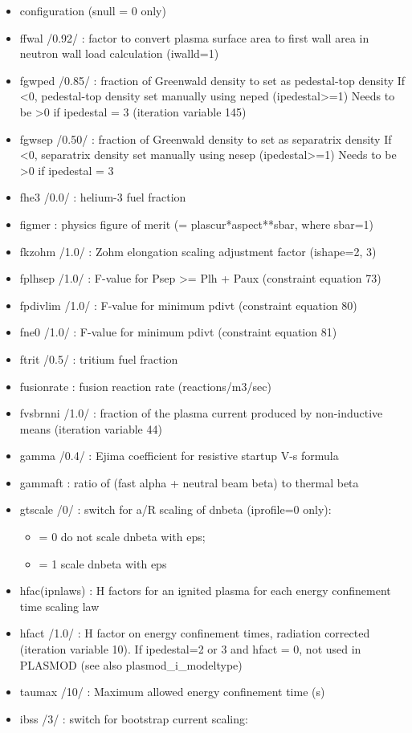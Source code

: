 \documentclass[]{article}
\providecommand{\tightlist}{%
  \setlength{\itemsep}{0pt}\setlength{\parskip}{0pt}}
\begin{document}
\begin{itemize}
\item
  configuration (snull = 0 only)
\item
  ffwal /0.92/ : factor to convert plasma surface area to first wall
  area in neutron wall load calculation (iwalld=1)
\item
  fgwped /0.85/ : fraction of Greenwald density to set as pedestal-top
  density If \textless{}0, pedestal-top density set manually using neped
  (ipedestal\textgreater{}=1) Needs to be \textgreater{}0 if ipedestal =
  3 (iteration variable 145)
\item
  fgwsep /0.50/ : fraction of Greenwald density to set as separatrix
  density If \textless{}0, separatrix density set manually using nesep
  (ipedestal\textgreater{}=1) Needs to be \textgreater{}0 if ipedestal =
  3
\item
  fhe3 /0.0/ : helium-3 fuel fraction
\item
  figmer : physics figure of merit (= plascur*aspect**sbar, where
  sbar=1)
\item
  fkzohm /1.0/ : Zohm elongation scaling adjustment factor (ishape=2, 3)
\item
  fplhsep /1.0/ : F-value for Psep \textgreater{}= Plh + Paux
  (constraint equation 73)
\item
  fpdivlim /1.0/ : F-value for minimum pdivt (constraint equation 80)
\item
  fne0 /1.0/ : F-value for minimum pdivt (constraint equation 81)
\item
  ftrit /0.5/ : tritium fuel fraction
\item
  fusionrate : fusion reaction rate (reactions/m3/sec)
\item
  fvsbrnni /1.0/ : fraction of the plasma current produced by
  non-inductive means (iteration variable 44)
\item
  gamma /0.4/ : Ejima coefficient for resistive startup V-s formula
\item
  gammaft : ratio of (fast alpha + neutral beam beta) to thermal beta
\item
  gtscale /0/ : switch for a/R scaling of dnbeta (iprofile=0 only):

  \begin{itemize}
  \tightlist
  \item
    = 0 do not scale dnbeta with eps;
  \item
    = 1 scale dnbeta with eps
  \end{itemize}
\item
  hfac(ipnlaws) : H factors for an ignited plasma for each energy
  confinement time scaling law
\item
  hfact /1.0/ : H factor on energy confinement times, radiation
  corrected (iteration variable 10). If ipedestal=2 or 3 and hfact = 0,
  not used in PLASMOD (see also plasmod\_i\_modeltype)
\item
  taumax /10/ : Maximum allowed energy confinement time (s)
\item
  ibss /3/ : switch for bootstrap current scaling:


\end{itemize}
\end{document}
